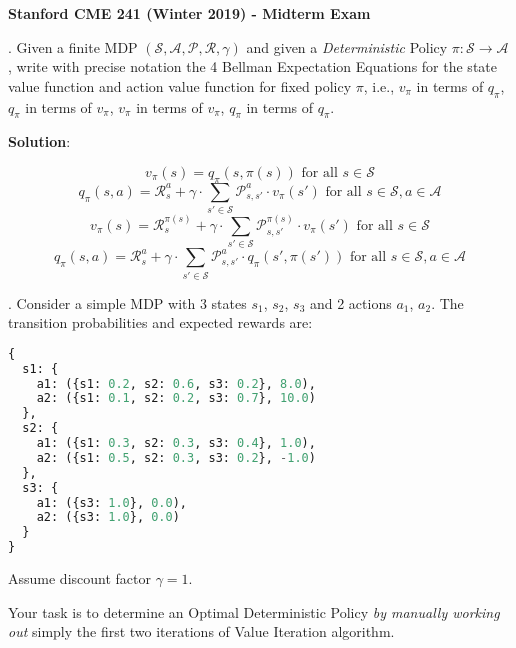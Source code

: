 \documentclass[12pt]{exam}
\begin{document}
\begin{center}
{\large {\bf Stanford CME 241 (Winter 2019) - Midterm Exam}}
\end{center}
\vspace{5mm}
 
\begin{questions}
.  Given a finite MDP $(\mathcal{S}, \mathcal{A}, \mathcal{P}, \mathcal{R}, \gamma)$ and given a {\em Deterministic} Policy $\pi: \mathcal{S} \rightarrow \mathcal{A}$,  write with precise notation the 4 Bellman Expectation Equations for the state value function and action value function for fixed policy $\pi$, i.e., $v_{\pi}$ in terms of $q_{\pi}$, $q_{\pi}$ in terms of $v_{\pi}$, $v_{\pi}$ in terms of $v_{\pi}$, $q_{\pi}$ in terms of $q_{\pi}$.

{\bf Solution}:
\begin{itemize}
$$v_{\pi}(s) = q_{\pi}(s,\pi(s)) \mbox{ for all } s \in \mathcal{S}$$
$$q_{\pi}(s, a) = \mathcal{R}_s^a + \gamma \cdot \sum_{s' \in \mathcal{S}} \mathcal{P}_{s,s'}^a \cdot v_{\pi}(s') \mbox{ for all } s \in \mathcal{S}, a \in \mathcal{A}$$
$$ v_{\pi}(s) = \mathcal{R}_s^{\pi(s)} + \gamma \cdot \sum_{s' \in \mathcal{S}} \mathcal{P}_{s,s'}^{\pi(s)} \cdot v_{\pi}(s')  \mbox{ for all } s \in \mathcal{S}$$
$$q_{\pi}(s, a) = \mathcal{R}_s^a + \gamma \cdot \sum_{s' \in \mathcal{S}} \mathcal{P}_{s,s'}^a \cdot q_{\pi}(s',\pi(s')) \mbox{ for all } s \in \mathcal{S}, a \in \mathcal{A}$$
\end{itemize}

\vspace{3mm}

. Consider a simple MDP with 3 states $s_1$, $s_2$, $s_3$ and 2 actions $a_1$, $a_2$. The transition probabilities and expected rewards are:
\begin{lstlisting}[language=python]
{
  s1: {
    a1: ({s1: 0.2, s2: 0.6, s3: 0.2}, 8.0),
    a2: ({s1: 0.1, s2: 0.2, s3: 0.7}, 10.0)
  },
  s2: {
    a1: ({s1: 0.3, s2: 0.3, s3: 0.4}, 1.0),
    a2: ({s1: 0.5, s2: 0.3, s3: 0.2}, -1.0)
  },
  s3: {
    a1: ({s3: 1.0}, 0.0),
    a2: ({s3: 1.0}, 0.0)
  }
}
\end{lstlisting}
Assume discount factor $\gamma = 1$.

Your task is to determine an Optimal Deterministic Policy {\em by manually working out} simply the first two iterations of Value Iteration algorithm. 


\end{questions}
\end{document}
